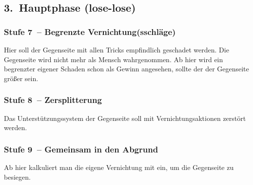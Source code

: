 \subsection{3.~Hauptphase (lose-lose)}

\subsubsection{Stufe 7~-- Begrenzte Vernichtung(sschläge)}

Hier soll der Gegenseite mit allen Tricks empfindlich geschadet werden. Die Gegenseite wird nicht mehr als Mensch wahrgenommen. Ab hier wird ein begrenzter eigener Schaden schon als Gewinn angesehen, sollte der der Gegenseite größer sein.

\subsubsection{Stufe 8~-- Zersplitterung}

Das Unterstützungssystem der Gegenseite soll mit Vernichtungsaktionen zerstört werden.

\subsubsection{Stufe 9~-- Gemeinsam in den Abgrund}

Ab hier kalkuliert man die eigene Vernichtung mit ein, um die Gegenseite zu besiegen.
